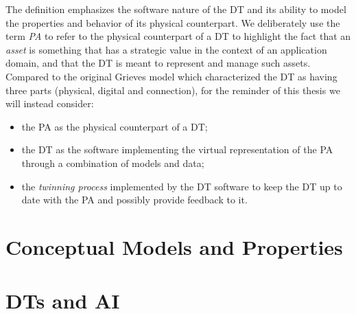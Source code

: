 The definition emphasizes the software nature of the \ac{DT} and its ability to model the properties and behavior of its physical counterpart.
%
We deliberately use the term \emph{\ac{PA}} to refer to the physical counterpart of a \ac{DT}
to highlight the fact that an \emph{asset} is something that has a strategic
value in the context of an application domain, and that the \ac{DT} is meant to represent and manage such assets.
%
Compared to the original Grieves model which characterized the \ac{DT} as having three parts (physical, digital and connection), for the reminder of this thesis we will instead consider:
\begin{itemize}
\item the \ac{PA} as the physical counterpart of a \ac{DT};
\item the \ac{DT} as the software implementing the virtual representation of the \ac{PA} through a combination of models and data;
\item the \emph{twinning process} implemented by the \ac{DT} software to keep the \ac{DT} up to date with the \ac{PA} and possibly provide feedback to it.
\end{itemize}

\section{Conceptual Models and Properties}








\section{\aclp{DT} and \acl{AI}}


